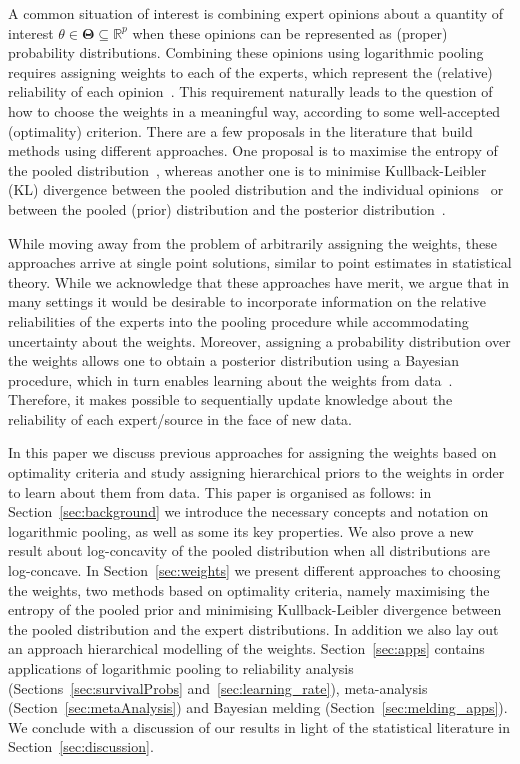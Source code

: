 \documentclass[a4paper, notitlepage, 11pt]{article}
\begin{document}
A common situation of interest is combining expert opinions about a quantity of interest $\theta \in \mathbf{\Theta} \subseteq \mathbb{R}^p$ when these opinions can be represented as (proper) probability distributions.
Combining these opinions using logarithmic pooling requires assigning weights to each of the experts, which represent the (relative) reliability of each opinion~\citep{Genest1984,French1985}.
This requirement naturally leads to the question of how to choose the weights in a meaningful way, according to some well-accepted (optimality) criterion.
There are a few proposals in the literature that build methods using different approaches.
One proposal is to maximise the entropy of the pooled distribution~\citep{Myung1996}, whereas another one is to minimise Kullback-Leibler (KL) divergence between the pooled distribution and the individual opinions~\citep{Abbas2009} or between the pooled (prior) distribution and the posterior distribution~\citep{Rufo2012A,Rufo2012B}.

While moving away from the problem of arbitrarily assigning the weights, these approaches arrive at single point solutions, similar to point estimates in statistical theory.
While we acknowledge that these approaches have merit, we argue that in many settings it would be desirable to incorporate  information on the relative reliabilities of the experts into the pooling procedure while accommodating uncertainty about the weights.
Moreover, assigning a probability distribution over the weights allows one to obtain a posterior distribution using a Bayesian procedure, which in turn enables learning about the weights from data~\citep{Poole2000}.
Therefore, it makes possible to sequentially update knowledge about the reliability of each expert/source in the face of new data.

In this paper we discuss previous approaches for assigning the weights based on optimality criteria and study assigning hierarchical priors to the weights in order to learn about them from data.
This paper is organised as follows: in Section~\ref{sec:background} we introduce the necessary concepts and notation on logarithmic pooling, as well as some its key properties.
We also prove a new result about log-concavity of the pooled distribution when all distributions are log-concave.
In Section~\ref{sec:weights} we present different approaches to choosing the weights, two methods based on optimality criteria, namely maximising the entropy of the pooled prior and minimising Kullback-Leibler divergence between the pooled distribution and the expert distributions.
In addition we also lay out an approach hierarchical modelling of the weights.
Section~\ref{sec:apps} contains applications of logarithmic pooling to reliability analysis (Sections~\ref{sec:survivalProbs} and~\ref{sec:learning_rate}), meta-analysis (Section~\ref{sec:metaAnalysis}) and Bayesian melding (Section~\ref{sec:melding_apps}).
We conclude with a discussion of our results in light of the statistical literature in Section~\ref{sec:discussion}.
\end{document}

